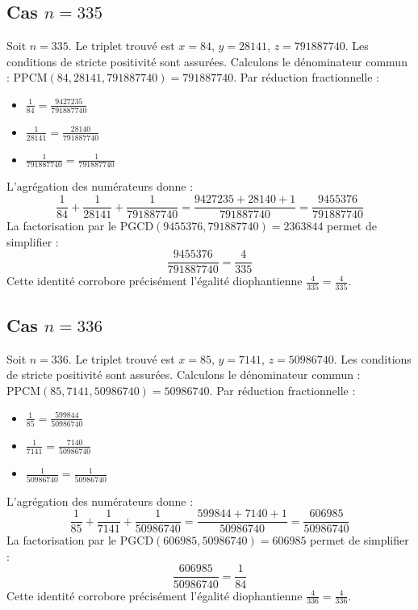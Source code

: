 \documentclass[11pt,a4paper]{article}
\begin{document}
\subsection{Cas $n = 335$}
Soit $n = 335$. Le triplet trouvé est $x = 84$, $y = 28141$, $z = 791887740$.
Les conditions de stricte positivité sont assurées.
Calculons le dénominateur commun : $\text{PPCM}(84, 28141, 791887740) = 791887740$.
Par réduction fractionnelle :
\begin{itemize}
    \item $\frac{1}{84} = \frac{9427235}{791887740}$
    \item $\frac{1}{28141} = \frac{28140}{791887740}$
    \item $\frac{1}{791887740} = \frac{1}{791887740}$
\end{itemize}
L'agrégation des numérateurs donne :
$$ \frac{1}{84} + \frac{1}{28141} + \frac{1}{791887740} = \frac{9427235 + 28140 + 1}{791887740} = \frac{9455376}{791887740} $$
La factorisation par le $\text{PGCD}(9455376, 791887740) = 2363844$ permet de simplifier :
$$ \frac{9455376}{791887740} = \frac{4}{335} $$
Cette identité corrobore précisément l'égalité diophantienne $\frac{4}{335} = \frac{4}{335}$.

\subsection{Cas $n = 336$}
Soit $n = 336$. Le triplet trouvé est $x = 85$, $y = 7141$, $z = 50986740$.
Les conditions de stricte positivité sont assurées.
Calculons le dénominateur commun : $\text{PPCM}(85, 7141, 50986740) = 50986740$.
Par réduction fractionnelle :
\begin{itemize}
    \item $\frac{1}{85} = \frac{599844}{50986740}$
    \item $\frac{1}{7141} = \frac{7140}{50986740}$
    \item $\frac{1}{50986740} = \frac{1}{50986740}$
\end{itemize}
L'agrégation des numérateurs donne :
$$ \frac{1}{85} + \frac{1}{7141} + \frac{1}{50986740} = \frac{599844 + 7140 + 1}{50986740} = \frac{606985}{50986740} $$
La factorisation par le $\text{PGCD}(606985, 50986740) = 606985$ permet de simplifier :
$$ \frac{606985}{50986740} = \frac{1}{84} $$
Cette identité corrobore précisément l'égalité diophantienne $\frac{4}{336} = \frac{4}{336}$.
\end{document}
